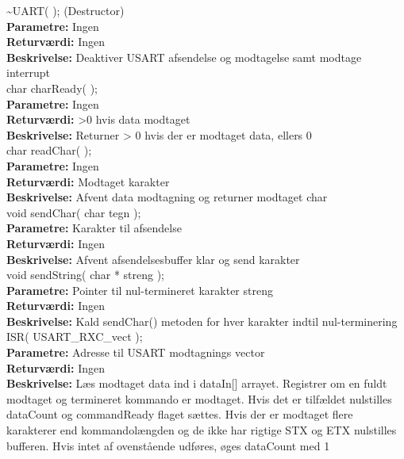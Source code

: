 \textasciitilde UART( ); (Destructor) \\
\textbf{Parametre:} Ingen \\
\textbf{Returværdi:} Ingen \\
\textbf{Beskrivelse:} Deaktiver USART afsendelse og modtagelse samt modtage interrupt \\

char charReady( ); \\
\textbf{Parametre:} Ingen \\
\textbf{Returværdi:} >0 hvis data modtaget \\
\textbf{Beskrivelse:} Returner > 0 hvis der er modtaget data, ellers 0 \\

char readChar( ); \\
\textbf{Parametre:} Ingen \\
\textbf{Returværdi:} Modtaget karakter \\
\textbf{Beskrivelse:} Afvent data modtagning og returner modtaget char \\

void sendChar( char tegn ); \\
\textbf{Parametre:} Karakter til afsendelse \\
\textbf{Returværdi:} Ingen \\
\textbf{Beskrivelse:} Afvent afsendelsesbuffer klar og send karakter \\

void sendString( char * streng ); \\
\textbf{Parametre:} Pointer til nul-termineret karakter streng \\
\textbf{Returværdi:} Ingen \\
\textbf{Beskrivelse:} Kald sendChar() metoden for hver karakter indtil nul-terminering \\

ISR( USART\_RXC\_vect ); \\
\textbf{Parametre:} Adresse til USART modtagnings vector \\
\textbf{Returværdi:} Ingen \\
\textbf{Beskrivelse:} Læs modtaget data ind i dataIn[] arrayet. Registrer om en fuldt modtaget og termineret kommando er modtaget. Hvis det er tilfældet nulstilles dataCount og commandReady flaget sættes. Hvis der er modtaget flere karakterer end kommandolængden og de ikke har rigtige STX og ETX nulstilles bufferen. Hvis intet af ovenstående udføres, øges dataCount med 1\\

